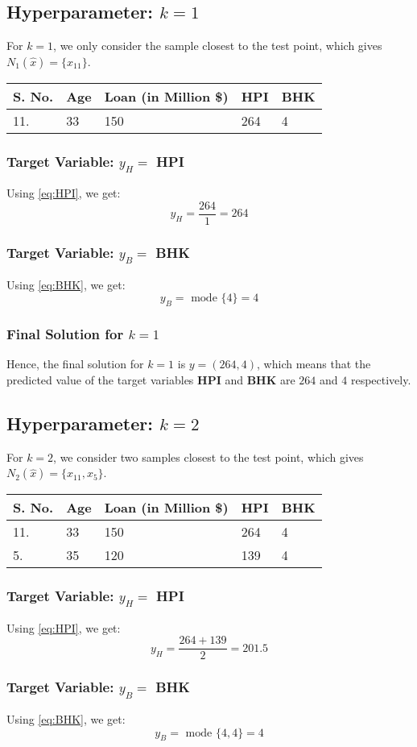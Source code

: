 \documentclass[12pt]{article}
\newcommand{\HPI}{\subsubsection*{Target Variable: $y_{H} =$ HPI}}
\newcommand{\BHK}{\subsubsection*{Target Variable: $y_{B} =$ BHK}}
\newcommand{\setk}[1]{\subsection*{Hyperparameter: $k = #1$}}
\newcommand{\solution}[3]{
    \subsubsection*{Final Solution for $k = #1$}
    Hence, the final solution for $k = #1$ is $y = (#2, #3)$, which means that the predicted value
    of the target variables \textbf{HPI} and \textbf{BHK} are $#2$ and $#3$ respectively.
}
\begin{document}
    \setk{1}
    For $k = 1$, we only consider the sample closest to the test point, which gives $N_{1}(\hat{x}) = \{ x_{11} \}$.

    \begin{center}
        \begin{tabular}{| m{15mm} | m{30mm} | m{50mm} | m{20mm} | m{20mm} |}
            \hline
            \textbf{S. No.} & \textbf{Age} & \textbf{Loan (in Million \$)} & \textbf{HPI} & \textbf{BHK} \\
            \hline
            \hline 11. & 33 & 150 & 264 & 4 \\
            \hline
        \end{tabular}
    \end{center}

    \HPI
    Using \eqref{eq:HPI}, we get:
    \begin{equation}
        y_{H} = \frac{264}{1} = 264
    \end{equation}

    \BHK
    Using \eqref{eq:BHK}, we get:
    \begin{equation}
        y_{B} = \text{ mode } \{4 \} = 4
    \end{equation}

    \solution{1}{264}{4}

    \setk{2}
    For $k = 2$, we consider two samples closest to the test point, which gives $N_{2}(\hat{x}) = \{ x_{11}, x_{5} \}$.

    \begin{center}
        \begin{tabular}{| m{15mm} | m{30mm} | m{50mm} | m{20mm} | m{20mm} |}
            \hline
            \textbf{S. No.} & \textbf{Age} & \textbf{Loan (in Million \$)} & \textbf{HPI} & \textbf{BHK} \\
            \hline
            \hline 11. & 33 & 150 & 264 & 4 \\
            \hline 5. & 35 & 120 & 139 & 4 \\
            \hline
        \end{tabular}
    \end{center}

    \HPI
    Using \eqref{eq:HPI}, we get:
    \begin{equation}
        y_{H} = \frac{264 + 139}{2} = 201.5
    \end{equation}

    \BHK
    Using \eqref{eq:BHK}, we get:
    \begin{equation}
        y_{B} = \text{ mode } \{4, 4 \} = 4
    \end{equation}
\end{document}
